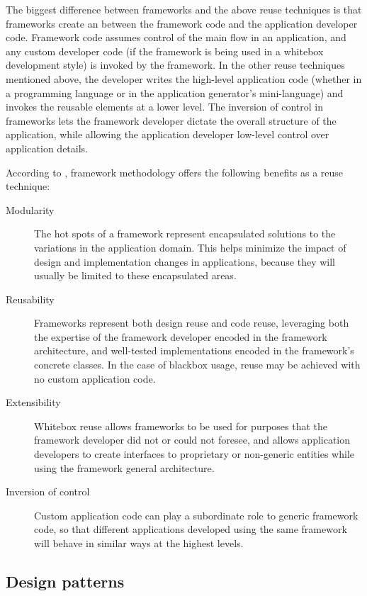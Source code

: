 The biggest difference between frameworks and the above reuse
techniques is that frameworks create an 
between the framework code and the application developer code.
Framework code assumes control of the main flow in an application, and
any custom developer code (if the framework is being used in a
whitebox development style) is invoked by the framework.  In the other
reuse techniques mentioned above, the developer writes the high-level
application code (whether in a programming language or in the
application generator's mini-language) and invokes the reusable
elements at a lower level.  The inversion of control in frameworks
lets the framework developer dictate the overall structure of the
application, while allowing the application developer low-level
control over application details. \cite[ch. 1]{fayad:99}

According to \cite[ch. 1]{fayad:99}, framework methodology offers the
following benefits as a reuse technique:

\begin{description}
\item[Modularity] The hot spots of a framework represent encapsulated
  solutions to the variations in the application domain.  This helps
  minimize the impact of design and implementation changes in
  applications, because they will usually be limited to these
  encapsulated areas.
\item[Reusability] Frameworks represent both design reuse and code
  reuse, leveraging both the expertise of the framework developer
  encoded in the framework architecture, and well-tested
  implementations encoded in the framework's concrete classes.  In the
  case of blackbox usage, reuse may be achieved with no custom
  application code.
\item[Extensibility] Whitebox reuse allows frameworks to be used for
  purposes that the framework developer did not or could not foresee,
  and allows application developers to create interfaces to
  proprietary or non-generic entities while using the framework
  general architecture.
\item[Inversion of control] Custom application code can play a
  subordinate role to generic framework code, so that different
  applications developed using the same framework will behave in
  similar ways at the highest levels.
\end{description}


\subsection{Design patterns}
\label{patterns}

